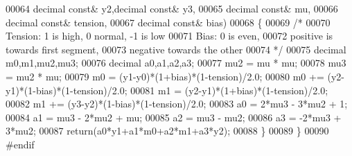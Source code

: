 \begin{DoxyCode}
00064                               decimal \textcolor{keyword}{const}& y2,decimal \textcolor{keyword}{const}& y3,
00065                               decimal \textcolor{keyword}{const}& mu,
00066                               decimal \textcolor{keyword}{const}& tension,
00067                               decimal \textcolor{keyword}{const}& bias)
00068     \{
00069         \textcolor{comment}{/*}
00070 \textcolor{comment}{         Tension: 1 is high, 0 normal, -1 is low}
00071 \textcolor{comment}{         Bias: 0 is even,}
00072 \textcolor{comment}{         positive is towards first segment,}
00073 \textcolor{comment}{         negative towards the other}
00074 \textcolor{comment}{         */}
00075         decimal m0,m1,mu2,mu3;
00076         decimal a0,a1,a2,a3;
00077         mu2 = mu * mu;
00078         mu3 = mu2 * mu;
00079         m0  = (y1-y0)*(1+bias)*(1-tension)/2.0;
00080         m0 += (y2-y1)*(1-bias)*(1-tension)/2.0;
00081         m1  = (y2-y1)*(1+bias)*(1-tension)/2.0;
00082         m1 += (y3-y2)*(1-bias)*(1-tension)/2.0;
00083         a0 =  2*mu3 - 3*mu2 + 1;
00084         a1 =    mu3 - 2*mu2 + mu;
00085         a2 =    mu3 -   mu2;
00086         a3 = -2*mu3 + 3*mu2;
00087         \textcolor{keywordflow}{return}(a0*y1+a1*m0+a2*m1+a3*y2);
00088     \}
00089 \}
00090 \textcolor{preprocessor}{#endif}
\end{DoxyCode}
